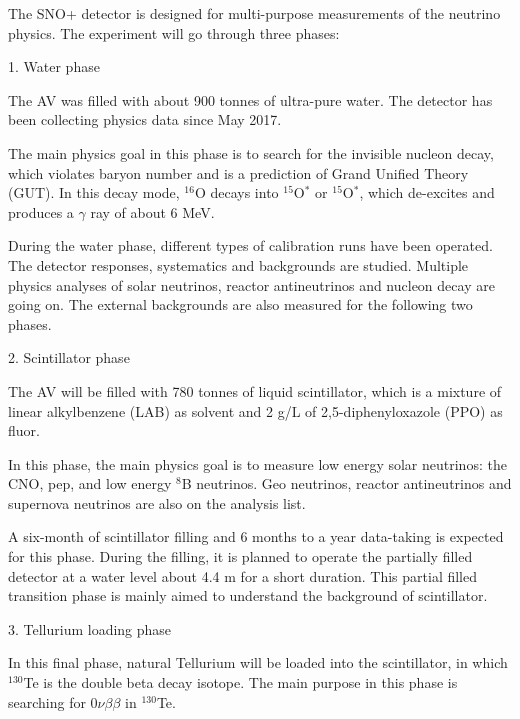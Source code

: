 \documentclass[preprint,12pt]{elsarticle}
\numberwithin{equation}{section}
\begin{document}
The SNO+ detector is designed for multi-purpose measurements of the neutrino physics.
The experiment will go through three phases\cite{whitepaper}: 

1. Water phase 

The AV was filled with about 900 tonnes of ultra-pure water. The detector has been collecting physics data since May 2017.

The main physics goal in this phase is to search for the invisible nucleon decay, which violates baryon number and is a prediction of Grand Unified Theory (GUT). In this decay mode, $^{16}$O decays into $^{15}$O$^*$ or $ ^{15}$O$^*$, which de-excites and produces a $\gamma$ ray of about 6 MeV.

During the water phase, different types of calibration runs have been operated. The detector responses, systematics and backgrounds are studied. Multiple physics analyses of solar neutrinos, reactor antineutrinos and nucleon decay are going on. The external backgrounds are also measured for the following two phases. 

2. Scintillator phase

The AV will be filled with 780 tonnes of liquid scintillator, which is a mixture of linear alkylbenzene (LAB) as solvent and 2 g/L of 2,5-diphenyloxazole (PPO) as fluor.

In this phase, the main physics goal is to measure low energy solar neutrinos: the CNO, pep, and low energy $^8$B neutrinos. Geo neutrinos, reactor antineutrinos and supernova neutrinos are also on the analysis list.

A six-month of scintillator filling and 6 months to a year data-taking is expected for this phase. During the filling, it is planned to operate the partially filled detector at a water level about 4.4 m for a short duration. This partial filled transition phase is mainly aimed to understand the background of scintillator. 

3. Tellurium loading phase

In this final phase, natural Tellurium will be loaded into the scintillator, in which $^{130}$Te is the double beta decay isotope. The main purpose in this phase is searching for $0\nu\beta\beta$ in $^{130}$Te.
\end{document}
